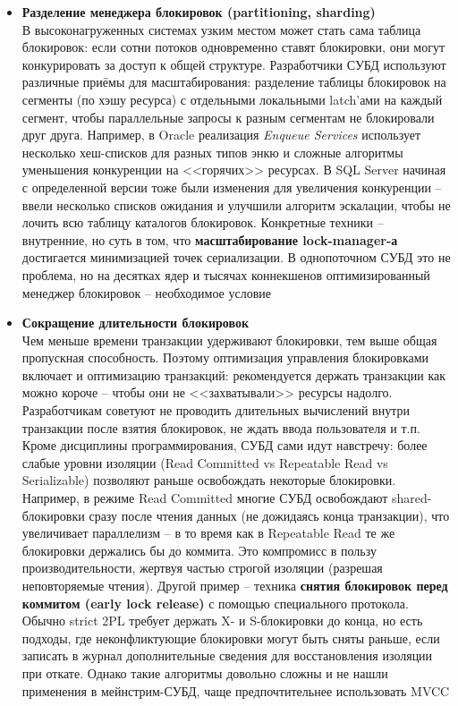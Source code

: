 \begin{itemize}
    \item \textbf{Разделение менеджера блокировок (partitioning, sharding)} ~\\
    В высоконагруженных системах узким местом может стать сама таблица блокировок: если сотни потоков одновременно ставят блокировки, они могут конкурировать за доступ к общей структуре. Разработчики СУБД используют различные приёмы для масштабирования: разделение таблицы блокировок на сегменты (по хэшу ресурса) с отдельными локальными latch’ами на каждый сегмент, чтобы параллельные запросы к разным сегментам не блокировали друг друга. Например, в Oracle реализация \textit{Enqueue Services} использует несколько хеш-списков для разных типов энкю и сложные алгоритмы уменьшения конкуренции на <<горячих>> ресурсах. В SQL Server начиная с определенной версии тоже были изменения для увеличения конкуренции – ввели несколько списков ожидания и улучшили алгоритм эскалации, чтобы не лочить всю таблицу каталогов блокировок. Конкретные техники – внутренние, но суть в том, что \textbf{масштабирование lock-manager-а} достигается минимизацией точек сериализации. В однопоточном СУБД это не проблема, но на десятках ядер и тысячах коннекшенов оптимизированный менеджер блокировок – необходимое условие
    \item \textbf{Сокращение длительности блокировок} ~\\
    Чем меньше времени транзакции удерживают блокировки, тем выше общая пропускная способность. Поэтому оптимизация управления блокировками включает и оптимизацию транзакций: рекомендуется держать транзакции как можно короче – чтобы они не <<захватывали>> ресурсы надолго. Разработчикам советуют не проводить длительных вычислений внутри транзакции после взятия блокировок, не ждать ввода пользователя и т.п. Кроме дисциплины программирования, СУБД сами идут навстречу: более слабые уровни изоляции (Read Committed vs Repeatable Read vs Serializable) позволяют раньше освобождать некоторые блокировки. Например, в режиме Read Committed многие СУБД освобождают shared-блокировки сразу после чтения данных (не дожидаясь конца транзакции), что увеличивает параллелизм – в то время как в Repeatable Read те же блокировки держались бы до коммита. Это компромисс в пользу производительности, жертвуя частью строгой изоляции (разрешая неповторяемые чтения). Другой пример – техника \textbf{снятия блокировок перед коммитом (early lock release)} с помощью специального протокола. Обычно strict 2PL требует держать X- и S-блокировки до конца, но есть подходы, где неконфликтующие блокировки могут быть сняты раньше, если записать в журнал дополнительные сведения для восстановления изоляции при откате. Однако такие алгоритмы довольно сложны и не нашли применения в мейнстрим-СУБД, чаще предпочтительнее использовать MVCC

\end{itemize}
